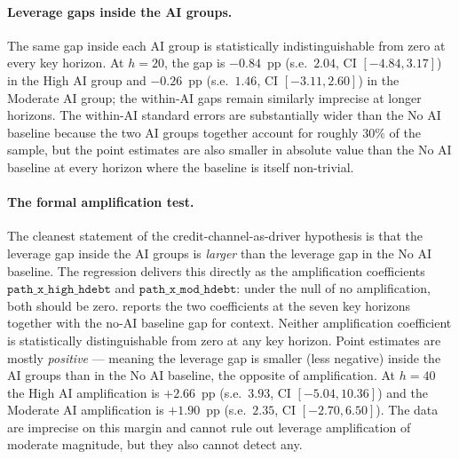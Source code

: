 \paragraph{Leverage gaps inside the AI groups.} The same gap inside
each AI group is statistically indistinguishable from zero at every
key horizon. At $h = 20$, the gap is $-0.84$~pp (s.e.~$2.04$,
CI $[-4.84, 3.17]$) in the High AI group and $-0.26$~pp
(s.e.~$1.46$, CI $[-3.11, 2.60]$) in the Moderate AI group; the
within-AI gaps remain similarly imprecise at longer horizons. The
within-AI standard errors are substantially wider than the No AI
baseline because the two AI groups together account for roughly
$30\%$ of the sample, but the point estimates are also smaller in
absolute value than the No AI baseline at every horizon where the
baseline is itself non-trivial.
 
\paragraph{The formal amplification test.} The cleanest statement of
the credit-channel-as-driver hypothesis is that the leverage gap
inside the AI groups is \emph{larger} than the leverage gap in the
No AI baseline. The regression delivers this directly as the
amplification coefficients $\texttt{path\_x\_high\_hdebt}$ and
$\texttt{path\_x\_mod\_hdebt}$: under the null of no amplification,
both should be zero.  reports the
two coefficients at the seven key horizons together with the no-AI
baseline gap for context. Neither amplification coefficient is
statistically distinguishable from zero at any key horizon. Point
estimates are mostly \emph{positive} --- meaning the leverage gap is
smaller (less negative) inside the AI groups than in the No AI
baseline, the opposite of amplification. At $h = 40$ the High AI
amplification is $+2.66$~pp (s.e.~$3.93$, CI $[-5.04, 10.36]$) and
the Moderate AI amplification is $+1.90$~pp (s.e.~$2.35$, CI
$[-2.70, 6.50]$). The data are imprecise on this margin and cannot
rule out leverage amplification of moderate magnitude, but they
also cannot detect any.
 
\begin{table}[htbp]
\centering\small
\caption[Leverage amplification by AI group: key-horizon estimates]{Leverage
amplification by AI group: key-horizon estimates}
\label{tab:debt_amplification_key}

\end{table}
 

